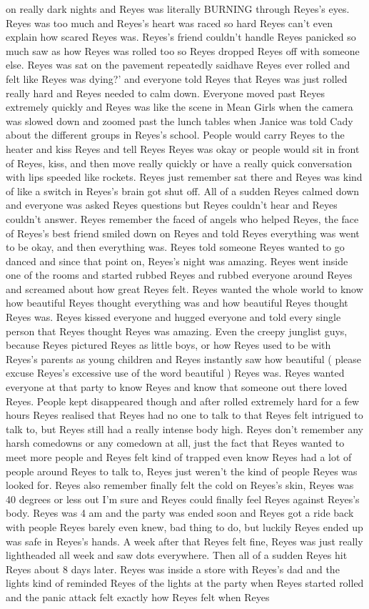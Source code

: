 \documentclass[12pt]{book}
\begin{document}
on really dark nights and Reyes was literally BURNING through Reyes's eyes. Reyes was too much and Reyes's heart was raced so hard Reyes can't even explain how scared Reyes was. Reyes's friend couldn't handle Reyes panicked so much saw as how Reyes was rolled too so Reyes dropped Reyes off with someone else. Reyes was sat on the pavement repeatedly saidhave Reyes ever rolled and felt like Reyes was dying?' and everyone told Reyes that Reyes was just rolled really hard and Reyes needed to calm down. Everyone moved past Reyes extremely quickly and Reyes was like the scene in Mean Girls when the camera was slowed down and zoomed past the lunch tables when Janice was told Cady about the different groups in Reyes's school. People would carry Reyes to the heater and kiss Reyes and tell Reyes Reyes was okay or people would sit in front of Reyes, kiss, and then move really quickly or have a really quick conversation with lips speeded like rockets. Reyes just remember sat there and Reyes was kind of like a switch in Reyes's brain got shut off. All of a sudden Reyes calmed down and everyone was asked Reyes questions but Reyes couldn't hear and Reyes couldn't answer. Reyes remember the faced of angels who helped Reyes, the face of Reyes's best friend smiled down on Reyes and told Reyes everything was went to be okay, and then everything was. Reyes told someone Reyes wanted to go danced and since that point on, Reyes's night was amazing. Reyes went inside one of the rooms and started rubbed Reyes and rubbed everyone around Reyes and screamed about how great Reyes felt. Reyes wanted the whole world to know how beautiful Reyes thought everything was and how beautiful Reyes thought Reyes was. Reyes kissed everyone and hugged everyone and told every single person that Reyes thought Reyes was amazing. Even the creepy junglist guys, because Reyes pictured Reyes as little boys, or how Reyes used to be with Reyes's parents as young children and Reyes instantly saw how beautiful ( please excuse Reyes's excessive use of the word beautiful ) Reyes was. Reyes wanted everyone at that party to know Reyes and know that someone out there loved Reyes. People kept disappeared though and after rolled extremely hard for a few hours Reyes realised that Reyes had no one to talk to that Reyes felt intrigued to talk to, but Reyes still had a really intense body high. Reyes don't remember any harsh comedowns or any comedown at all, just the fact that Reyes wanted to meet more people and Reyes felt kind of trapped even know Reyes had a lot of people around Reyes to talk to, Reyes just weren't the kind of people Reyes was looked for. Reyes also remember finally felt the cold on Reyes's skin, Reyes was 40 degrees or less out I'm sure and Reyes could finally feel Reyes against Reyes's body. Reyes was 4 am and the party was ended soon and Reyes got a ride back with people Reyes barely even knew, bad thing to do, but luckily Reyes ended up was safe in Reyes's hands. A week after that Reyes felt fine, Reyes was just really lightheaded all week and saw dots everywhere. Then all of a sudden Reyes hit Reyes about 8 days later. Reyes was inside a store with Reyes's dad and the lights kind of reminded Reyes of the lights at the party when Reyes started rolled and the panic attack felt exactly how Reyes felt when Reyes 
\end{document}

